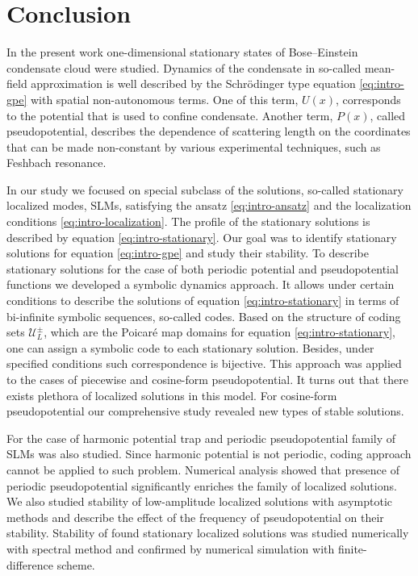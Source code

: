 \chapter*{Conclusion}
\label{conclusion}

In the present work one-dimensional stationary states of Bose--Einstein condensate cloud were studied.
Dynamics of the condensate in so-called mean-field ap­proximation is well described by the Schr\"odinger type equation \eqref{eq:intro-gpe} with spatial non-au­tonomous terms.
One of this term, $U(x)$, corresponds to the potential that is used to confine condensate.
Another term, $P(x)$, called pseudopotential, describes the dependence of scattering length on the coordinates that can be made non-constant by various experimental techniques, such as Feshbach resonance.

In our study we focused on special subclass of the solutions, so-called stationary localized modes, SLMs, satisfying the ansatz \eqref{eq:intro-ansatz} and the localization conditions \eqref{eq:intro-localization}.
The profile of the stationary solutions is described by equation \eqref{eq:intro-stationary}.
Our goal was to identify stationary solutions for equation \eqref{eq:intro-gpe} and study their stability.
To describe stationary solutions for the case of both periodic potential and pseudopotential functions we developed a symbolic dynamics approach.
It allows under certain conditions to describe the solutions of equation \eqref{eq:intro-stationary} in terms of bi-infinite symbolic sequences, so-called codes.
Based on the structure of coding sets $\mathscr{U}_L^{\pm}$, which are the Poicar\'e map domains for equation \eqref{eq:intro-stationary}, one can assign a symbolic code to each stationary solution.
Besides, under specified conditions such correspondence is bijective.
This approach was applied to the cases of piecewise and cosine-form pseudopotential.
It turns out that there exists plethora of localized solutions in this model.
For cosine-form pseudopotential our comprehensive study revealed new types of stable solutions.

For the case of harmonic potential trap and periodic pseudopotential family of SLMs was also studied.
Since harmonic potential is not periodic, coding approach cannot be applied to such problem.
Numerical analysis showed that presence of periodic pseudopotential significantly enriches the family of localized solutions.
We also studied stability of low-amplitude localized solutions with asymptotic methods and describe the effect of the frequency of pseudopotential on their stability.
Stability of found stationary localized solutions was studied numerically with spectral method and confirmed by numerical simulation with finite-difference scheme.

